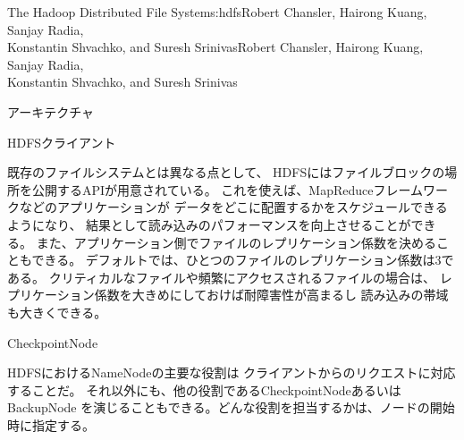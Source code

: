 \begin{aosachaptertoc}{The Hadoop Distributed File System}{s:hdfs}{Robert Chansler, Hairong Kuang, Sanjay Radia, \\ Konstantin Shvachko, and Suresh Srinivas}{Robert Chansler, Hairong Kuang, Sanjay Radia, \\ \hspace*{0.9cm} Konstantin Shvachko, and Suresh Srinivas}
\begin{aosasect1}{アーキテクチャ}
\begin{aosasect2}{HDFSクライアント}

既存のファイルシステムとは異なる点として、
HDFSにはファイルブロックの場所を公開するAPIが用意されている。
これを使えば、MapReduceフレームワークなどのアプリケーションが
データをどこに配置するかをスケジュールできるようになり、
結果として読み込みのパフォーマンスを向上させることができる。
また、アプリケーション側でファイルのレプリケーション係数を決めることもできる。
デフォルトでは、ひとつのファイルのレプリケーション係数は3である。
クリティカルなファイルや頻繁にアクセスされるファイルの場合は、
レプリケーション係数を大きめにしておけば耐障害性が高まるし
読み込みの帯域も大きくできる。

\end{aosasect2}

\begin{aosasect2}{CheckpointNode}

HDFSにおけるNameNodeの主要な役割は
クライアントからのリクエストに対応することだ。
それ以外にも、他の役割であるCheckpointNodeあるいはBackupNode
を演じることもできる。どんな役割を担当するかは、ノードの開始時に指定する。


\end{aosasect2}
\end{aosasect1}
\end{aosachaptertoc}
